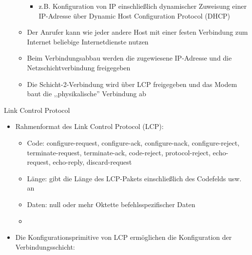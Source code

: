 \documentclass[a4paper]{article}
\begin{document}
\begin{multicols}{3}
\begin{itemize}
\begin{itemize}
                        \begin{itemize}
                            \item
                                  z.B. Konfiguration von IP einschließlich dynamischer Zuweisung
                                  einer IP-Adresse über Dynamic Host Configuration Protocol (DHCP)
                        \end{itemize}
                  \item
                        Der Anrufer kann wie jeder andere Host mit einer festen Verbindung
                        zum Internet beliebige Internetdienste nutzen
                  \item
                        Beim Verbindungsabbau werden die zugewiesene IP-Adresse und die
                        Netzschichtverbindung freigegeben
                  \item
                        Die Schicht-2-Verbindung wird über LCP freigegeben und das Modem
                        baut die ,,physikalische'' Verbindung ab
              \end{itemize}
    \end{itemize}

    Link Control Protocol

    \begin{itemize}
        \item
              Rahmenformat des Link Control Protocol (LCP):

              \begin{itemize}
                  \item
                        Code: configure-request, configure-ack, configure-nack,
                        configure-reject, terminate-request, terminate-ack, code-reject,
                        protocol-reject, echo-request, echo-reply, discard-request
                  \item
                        Länge: gibt die Länge des LCP-Pakets einschließlich des Codefelds
                        usw. an
                  \item
                        Daten: null oder mehr Oktette befehlsspezifischer Daten
                  \item
              \end{itemize}
        \item
              Die Konfigurationsprimitive von LCP ermöglichen die Konfiguration der
              Verbindungsschicht:


\end{itemize}
\end{multicols}
\end{document}
